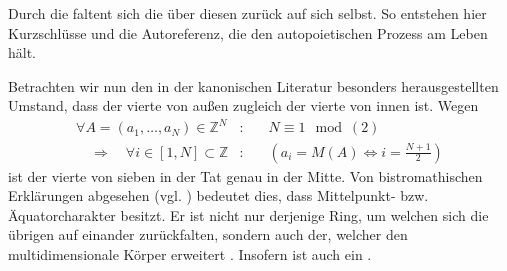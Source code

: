 \begin{newstuff}
    Durch die  faltent sich die  über diesen  zurück auf sich selbst. So entstehen hier Kurzschlüsse und die Autoreferenz, die den autopoietischen Prozess am Leben hält. 

    Betrachten wir nun den in der kanonischen Literatur besonders herausgestellten Umstand, dass der vierte  von außen zugleich der vierte von innen ist. Wegen
        \begin{equation}
        \begin{array}{rcl}
            \forall A = (a_1,\ldots,a_N) \in \mathbb{Z}^N&:&
            \quad
            N\equiv 1\mod(2)\\
            \quad\Rightarrow\quad
            \forall i \in [1,N] \subset \mathbb{Z}&:&
            \quad
            \left(
            a_i = M(A) \Leftrightarrow i = \frac{N+1}{2}
            \right)
        \end{array}
        \end{equation}
    ist der vierte  von sieben in der Tat genau in der Mitte.
    Von bistromathischen  Erklärungen abgesehen (vgl. \cite[Kap. 4]{adams_life})  bedeutet dies, dass   Mittelpunkt- bzw. Äquatorcharakter besitzt. 
    Er ist nicht nur derjenige Ring, um welchen sich die übrigen  auf einander zurückfalten, sondern auch der, welcher den multidimensionale Körper erweitert . Insofern ist  auch ein .
\end{newstuff}